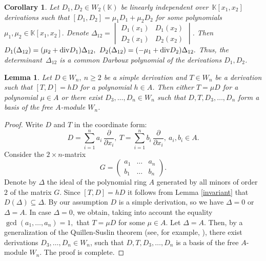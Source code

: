 \documentclass[12pt,a4paper]{amsart}
\theoremstyle{plain}
\newtheorem{lemma}{Lemma}
\newtheorem{corollary}{Corollary}
\theoremstyle{definition}
\begin{document}
{	\begin{corollary}\label{delta}
		Let $D_1, D_2 \in W_2(\mathbb{K})$ be linearly independent over~$\mathbb{K}[x_1,x_2]$ derivations such that  
		$[D_1, D_2] = \mu_1 D_1 + \mu_2 D_2$ for some polynomials $\mu_1, \mu_2\in \mathbb{K}[x_1,x_2].$ Denote  $\Delta_{12} = \begin{vmatrix} D_1(x_1) & D_1(x_2) \\ D_2(x_1) & D_2(x_2) \end{vmatrix}$.
		Then $
		D_1(\Delta_{12}) = (\mu_2 + {\rm div}D_1) \Delta_{12} ,	$
		$	D_2(\Delta_{12}) = (-\mu_1 + {\rm div}D_2) \Delta_{12}.	$
		Thus, the determinant~$\Delta_{12}$ is a common Darboux polynomial of the derivations $D_1, D_2$.
	\end{corollary}
	
	
	
	
	\begin{lemma}\label{lemma3}
		Let $D \in W_n, \ n\geq2$ be a simple derivation and  $T\in W_n$ be a derivation such that  $[T, D] = hD$ for a polynomial $h \in A$. Then either $T = \mu D$ for a polynomial $\mu \in A$ or there exist $D_3, \ldots, D_n \in W_n$ such that $D, T, D_3, \ldots, D_n$ form a basis of the free $A$-module $W_n$.
	\end{lemma} 
	
	\begin{proof}
		Write $D$ and $T$ in the coordinate form: 
		$$D = \sum_{i=1}^{n} a_i \, \frac{\partial}{\partial x_i}, \  T = \sum_{i=1}^{n} b_i \, \frac{\partial}{\partial x_i}, \ a_i, b_i \in A.$$
		Consider the $2 \times n$-matrix 
		$$
		G = \begin{pmatrix}
			a_1 & \dots & a_n \\
			b_1 & \dots & b_n 
		\end{pmatrix}.
		$$
		Denote by $\Delta$ the ideal of the polynomial ring $A$ generated by all minors of order $2$ of the matrix $G$. Since $[T, D] = hD$ it follows from Lemma \ref{invariant} that $D(\Delta) \subseteq \Delta$. By our assumption $D$ is a simple derivation, so we have $\Delta = 0$ or $\Delta =A$. In case $\Delta =0$,  we obtain, taking into account the equality $\gcd(a_1, \ldots, a_n) = 1,$ that $T = \mu D$ for some $\mu \in A$. Let $\Delta =A$. Then, by a generalization of the Quillen-Suslin theorem (see, for example, \cite{GQS}), there exist  derivations $D_3, \ldots, D_n \in W_n$, such that $D, T, D_3, \ldots, D_n$ is a basis of the free $A$-module $W_n$. The proof is complete.
	\end{proof} 
	
}
\end{document}
